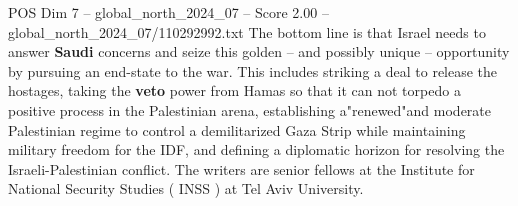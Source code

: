 \begin{textsample}{POS Dim 7 – global\_north\_2024\_07 – Score 2.00 – global\_north\_2024\_07/110292992.txt}
The bottom line is that Israel needs to answer \textbf{Saudi} concerns and seize this golden -- and possibly unique -- opportunity by pursuing an end-state to the war.
This includes striking a deal to release the hostages, taking the \textbf{veto} power from Hamas so that it can not torpedo a positive process in the Palestinian arena, establishing a"renewed"and moderate Palestinian regime to control a demilitarized Gaza Strip while maintaining military freedom for the IDF, and defining a diplomatic horizon for resolving the Israeli-Palestinian conflict.
The writers are senior fellows at the Institute for National Security Studies ( INSS ) at Tel Aviv University.

\end{textsample}
